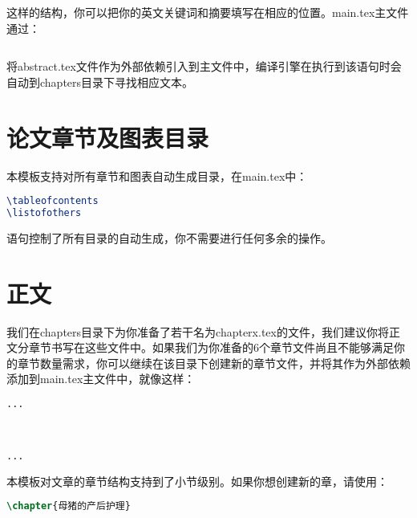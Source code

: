 \noindent 这样的结构，你可以把你的英文关键词和摘要填写在相应的位置。main.tex主文件通过：

\begin{tcolorbox}
\begin{lstlisting}[language=TeX]

\end{lstlisting}
\end{tcolorbox}

\noindent 将abstract.tex文件作为外部依赖引入到主文件中，编译引擎在执行到该语句时会自动到chapters目录下寻找相应文本。

\section{论文章节及图表目录}
\label{sec:content}

本模板支持对所有章节和图表自动生成目录，在main.tex中：

\begin{tcolorbox}
\begin{lstlisting}[language=TeX]
\tableofcontents
\listofothers
\end{lstlisting}
\end{tcolorbox}

\noindent 语句控制了所有目录的自动生成，你不需要进行任何多余的操作。

\section{正文}
\label{sec:main_body}

我们在chapters目录下为你准备了若干名为chapterx.tex的文件，我们建议你将正文分章节书写在这些文件中。如果我们为你准备的6个章节文件尚且不能够满足你的章节数量需求，你可以继续在该目录下创建新的章节文件，并将其作为外部依赖添加到main.tex主文件中，就像这样：

\begin{tcolorbox}
\begin{lstlisting}[language=TeX]
...



...
\end{lstlisting}
\end{tcolorbox}

本模板对文章的章节结构支持到了小节级别。如果你想创建新的章，请使用：

\begin{tcolorbox}
\begin{lstlisting}[language=TeX]
\chapter{母猪的产后护理}
\end{lstlisting}
\end{tcolorbox}

